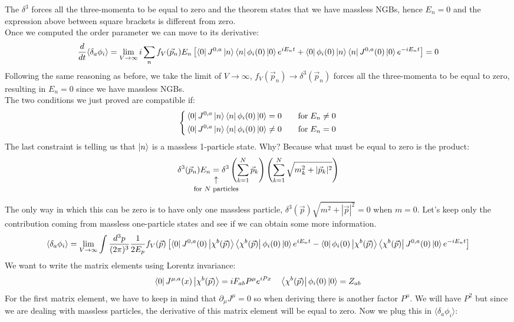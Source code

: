 \documentclass[../main.tex]{subfiles}
\begin{document}
The $\delta^3$ forces all the three-momenta to be equal to zero and the theorem states that we have massless NGBs, hence $E_n=0$ and the expression above between square brackets is different from zero.\\
Once we computed the order parameter we can move to its derivative:
\[
\frac{d}{dt}\langle\delta_a\phi_i\rangle=\lim_{V\to\infty}i\sum_nf_V(\Vec{p}_n)E_n\left[\bra{0}J^{0,a}\ket{n}\bra{n}\phi_i(0)\ket{0}e^{iE_nt}+\bra{0}\phi_i(0)\ket{n}\bra{n}J^{0,a}(0)\ket{0}e^{-iE_nt}\right]=0
\]
Following the same reasoning as before, we take the limit of $V\to\infty$, $f_V(\Vec{p}_n)\to\delta^3(\Vec{p}_n)$ forces all the three-momenta to be equal to zero, resulting in $E_n=0$ since we have massless NGBs.\\
The two conditions we just proved are compatible if:
\[
\left\{
\begin{aligned}
&\bra{0}J^{0,a}\ket{n}\bra{n}\phi_i(0)\ket{0}=0\quad &&\text{for}\;E_n\neq0\\
&\bra{0}J^{0,a}\ket{n}\bra{n}\phi_i(0)\ket{0}\neq0\quad &&\text{for}\;E_n=0
\end{aligned}
\right.
\]
The last constraint is telling us that $\ket{n}$ is a massless 1-particle state. Why? Because what must be equal to zero is the product:
\[
\delta^3(\Vec{p}_n)E_n\underset{\mathclap{\tikz \node {$\uparrow$} node [below=1ex] {\footnotesize for $N$ particles };}}{=}\delta^3\left(\sum_{k=1}^N\Vec{p}_k\right)\left(\sum_{k=1}^N\sqrt{m_k^2+|\Vec{p}_k|^2}\right)
\]
The only way in which this can be zero is to have only one massless particle, $\delta^3(\Vec{p})\sqrt{m^2+|\Vec{p}|^2}=0$ when $m=0$. Let's keep only the contribution coming from massless one-particle states and see if we can obtain some more information.
\[
\langle\delta_a\phi_i\rangle=\lim_{V\to\infty}\int\frac{d^3p}{(2\pi)^3}\frac{1}{2E_p}f_V(\Vec{p})\left[\bra{0}J^{0,a}(0)\ket{\chi^b(\Vec{p})}\bra{\chi^b(\Vec{p})}\phi_i(0)\ket{0}e^{iE_nt}-\bra{0}\phi_i(0)\ket{\chi^b(\Vec{p})}\bra{\chi^b(\Vec{p})}J^{0,a}(0)\ket{0}e^{-iE_nt}\right]
\]
We want to write the matrix elements using Lorentz invariance:
\[
\bra{0}J^{\mu,a}(x)\ket{\chi^b(\Vec{p})}=iF_{ab}P^\mu e^{iPx} \quad \bra{\chi^b(\Vec{p})}\phi_i(0)\ket{0}=Z_{ab}
\]
For the first matrix element, we have to keep in mind that $\partial_\mu J^\mu=0$ so when deriving there is another factor $P^\mu$. We will have $P^2$ but since we are dealing with massless particles, the derivative of this matrix element will be equal to zero. Now we plug this in $\langle\delta_a\phi_i\rangle$:
\end{document}
